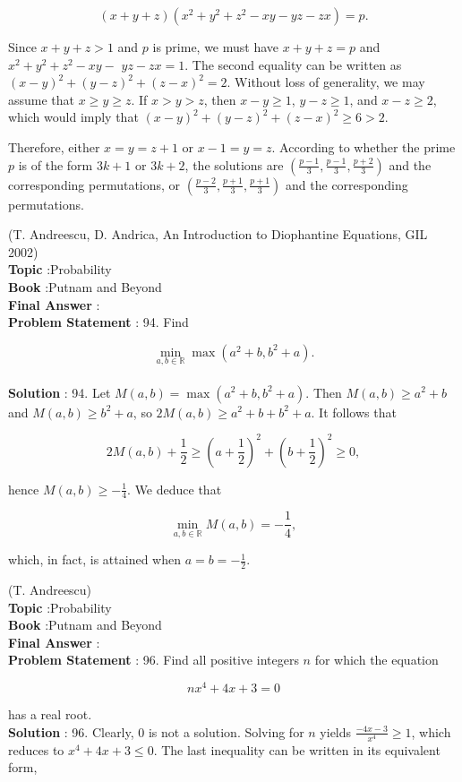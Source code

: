 \documentclass[10pt]{article}
\begin{document}
$$
(x+y+z)\left(x^{2}+y^{2}+z^{2}-x y-y z-z x\right)=p .
$$

Since $x+y+z>1$ and $p$ is prime, we must have $x+y+z=p$ and $x^{2}+y^{2}+z^{2}-x y-$ $y z-z x=1$. The second equality can be written as $(x-y)^{2}+(y-z)^{2}+(z-x)^{2}=2$. Without loss of generality, we may assume that $x \geq y \geq z$. If $x>y>z$, then $x-y \geq 1$, $y-z \geq 1$, and $x-z \geq 2$, which would imply that $(x-y)^{2}+(y-z)^{2}+(z-x)^{2} \geq 6>2$.

Therefore, either $x=y=z+1$ or $x-1=y=z$. According to whether the prime $p$ is of the form $3 k+1$ or $3 k+2$, the solutions are $\left(\frac{p-1}{3}, \frac{p-1}{3}, \frac{p+2}{3}\right)$ and the corresponding permutations, or $\left(\frac{p-2}{3}, \frac{p+1}{3}, \frac{p+1}{3}\right)$ and the corresponding permutations.

(T. Andreescu, D. Andrica, An Introduction to Diophantine Equations, GIL 2002)
\\
\textbf{Topic} :Probability\\
\textbf{Book} :Putnam and Beyond\\
\textbf{Final Answer} :\\


\textbf{Problem Statement} :
94. Find

$$
\min _{a, b \in \mathbb{R}} \max \left(a^{2}+b, b^{2}+a\right) .
$$
\\
\textbf{Solution} :
94. Let $M(a, b)=\max \left(a^{2}+b, b^{2}+a\right)$. Then $M(a, b) \geq a^{2}+b$ and $M(a, b) \geq b^{2}+a$, so $2 M(a, b) \geq a^{2}+b+b^{2}+a$. It follows that

$$
2 M(a, b)+\frac{1}{2} \geq\left(a+\frac{1}{2}\right)^{2}+\left(b+\frac{1}{2}\right)^{2} \geq 0,
$$

hence $M(a, b) \geq-\frac{1}{4}$. We deduce that

$$
\min _{a, b \in \mathbb{R}} M(a, b)=-\frac{1}{4},
$$

which, in fact, is attained when $a=b=-\frac{1}{2}$.

(T. Andreescu)
\\
\textbf{Topic} :Probability\\
\textbf{Book} :Putnam and Beyond\\
\textbf{Final Answer} :\\


\textbf{Problem Statement} :
96. Find all positive integers $n$ for which the equation

$$
n x^{4}+4 x+3=0
$$

has a real root.
\\
\textbf{Solution} :
96. Clearly, 0 is not a solution. Solving for $n$ yields $\frac{-4 x-3}{x^{4}} \geq 1$, which reduces to $x^{4}+4 x+3 \leq 0$. The last inequality can be written in its equivalent form,
\end{document}
